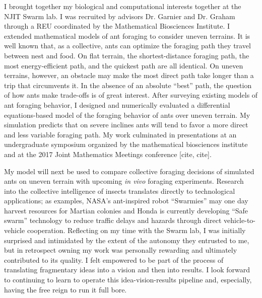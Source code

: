 I brought together my biological and computational interests together at the NJIT Swarm lab.
I was recruited by advisors Dr. Garnier and Dr. Graham through a REU coordinated by the Mathematical Biosciences Institute.
I extended mathematical models of ant foraging to consider uneven terrains.
It is well known that, as a collective, ants can optimize the foraging path they travel between nest and food.
On flat terrain, the shortest-distance foraging path, the most energy-efficient path, and the quickest path are all identical.
On uneven terrains, however, an obstacle may make the most direct path take longer than a trip that circumvents it.
In the absence of an absolute ``best'' path, the question of how ants make trade-offs is of great interest.
After surveying existing models of ant foraging behavior, I designed and numerically evaluated a differential equations-based model of the foraging behavior of ants over uneven terrain.
My simulation predicts that on severe inclines ants will tend to favor a more direct and less variable foraging path.
My work culminated in presentations at an undergraduate symposium organized by the mathematical biosciences institute and at the 2017 Joint Mathematics Meetings conference [cite, cite].

My model will next be used to compare collective foraging decisions of simulated ants on uneven terrain with upcoming \textit{in vivo} foraging experiments.
Research into the collective intelligence of insects translates directly to technological applications;
as examples, NASA's ant-inspired robot ``Swarmies'' may one day harvest resources for Martian colonies and Honda is currently developing ``Safe swarm'' technology to reduce traffic delays and hazards through direct vehicle-to-vehicle cooperation.
Reflecting on my time with the Swarm lab, I was initially surprised and intimidated by the extent of the autonomy they entrusted to me, but in retrospect owning my work was personally rewarding and ultimately contributed to its quality.
I felt empowered to be part of the process of translating fragmentary ideas into a vision and then into results.
I look forward to continuing to learn to operate this idea-vision-results pipeline and, especially, having the free reign to run it full bore.

